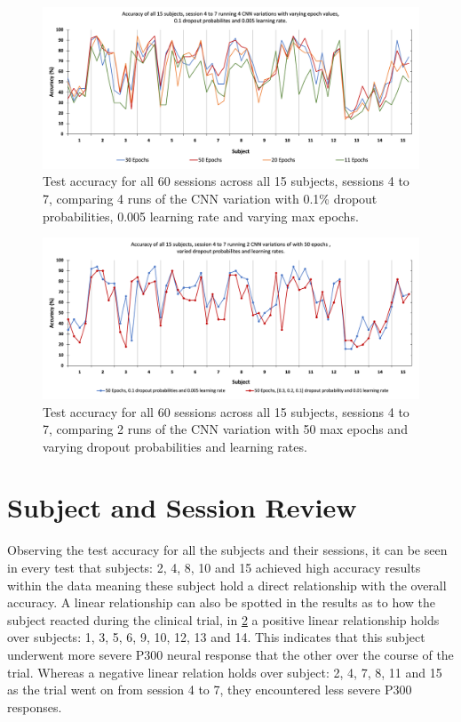 \begin{figure}[H]
\centering
\includegraphics[scale=0.5]{Media/SBJ1-15_S4-7/SBJ1-15&S4-7_30&50&20&11_Epochs_Accuracy.png}
\caption{Test accuracy for all 60 sessions across all 15 subjects, sessions 4 to 7, comparing 4 runs of the CNN variation with 0.1\% dropout probabilities, 0.005 learning rate and varying max epochs.}
\label{S4-7 varied epochs}
\end{figure}

\begin{figure}[H]
\centering
\includegraphics[scale=0.5]{Media/SBJ1-15_S4-7/SBJ1-15&S4-7_50_Epochs_Varied_Accuracy.png}
\caption{Test accuracy for all 60 sessions across all 15 subjects, sessions 4 to 7, comparing 2 runs of the CNN variation with 50 max epochs and varying dropout probabilities and learning rates.}
\label{S4-7 50 epochs vary dr lr}
\end{figure}

\section{Subject and Session Review}
\label{Subject and Session Review Section}

Observing the test accuracy for all the subjects and their sessions, it can be seen in every test that subjects: 2, 4, 8, 10 and 15 achieved high accuracy results within the data meaning these subject hold a direct relationship with the overall accuracy. A linear relationship can also be spotted in the results as to how the subject reacted during the clinical trial, in \cref{S4-7 50 epochs vary dr lr} a positive linear relationship holds over subjects: 1, 3, 5, 6, 9, 10, 12, 13 and 14. This indicates that this subject underwent more severe P300 neural response that the other over the course of the trial. Whereas a negative linear relation holds over subject: 2, 4, 7, 8, 11 and 15 as the trial went on from session 4 to 7, they encountered less severe P300 responses.